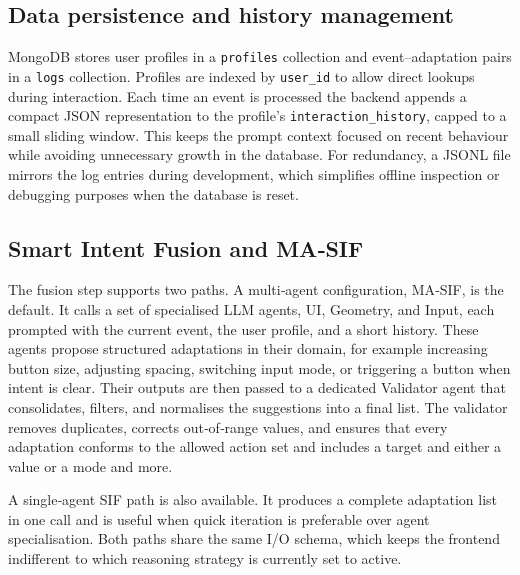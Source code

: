 \documentclass[openany]{book}
\begin{document}
\subsection{Data persistence and history management}
MongoDB stores user profiles in a \texttt{profiles} collection and event–adaptation pairs in a \texttt{logs} collection. Profiles are indexed by \texttt{user\_id} to allow direct lookups during interaction. Each time an event is processed the backend appends a compact JSON representation to the profile’s \texttt{interaction\_history}, capped to a small sliding window. This keeps the prompt context focused on recent behaviour while avoiding unnecessary growth in the database. For redundancy, a JSONL file mirrors the log entries during development, which simplifies offline inspection or debugging purposes when the database is reset.

\subsection{Smart Intent Fusion and MA‑SIF}
The fusion step supports two paths. A multi‑agent configuration, MA‑SIF, is the default. It calls a set of specialised LLM agents, UI, Geometry, and Input, each prompted with the current event, the user profile, and a short history. These agents propose structured adaptations in their domain, for example increasing button size, adjusting spacing, switching input mode, or triggering a button when intent is clear. Their outputs are then passed to a dedicated Validator agent that consolidates, filters, and normalises the suggestions into a final list. The validator removes duplicates, corrects out‑of‑range values, and ensures that every adaptation conforms to the allowed action set and includes a target and either a value or a mode and more.

A single‑agent SIF path is also available. It produces a complete adaptation list in one call and is useful when quick iteration is preferable over agent specialisation. Both paths share the same I/O schema, which keeps the frontend indifferent to which reasoning strategy is currently set to active.

\end{document}
